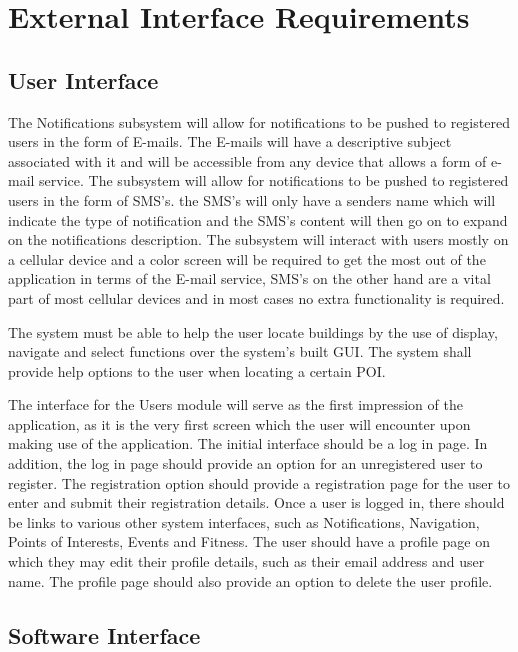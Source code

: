 \documentclass{article}
\begin{document}
\section{External Interface Requirements}
\subsection{User Interface}


The Notifications subsystem will allow for notifications to be pushed to registered users in the form of E-mails. The E-mails will have a descriptive subject associated with it and will be accessible from any device that allows a form of e-mail service.
The subsystem will allow for notifications to be pushed to registered users in the form of SMS's. the SMS's will only have a senders name which will indicate the type of notification and the SMS's content will then go on to expand on the notifications description.
The subsystem will interact with users mostly on a cellular device and a color screen will be required to get the most out of the application in terms of the E-mail service, SMS's on the other hand are a vital part of most cellular devices and in most cases no extra functionality is required.

The system must be able to help the user locate buildings by the use of display, navigate and select functions over the system's built GUI.
The system shall provide help options to the user when locating a certain POI.

\bigskip
The interface for the Users module will serve as the first impression of the application, as it is the very first screen which the user will encounter upon making use of the application. The initial interface should be a log in page. In addition, the log in page should provide an option for an unregistered user to register. The registration option should provide a registration page for the user to enter and submit their registration details. Once a user is logged in, there should be links to various other system interfaces, such as Notifications, Navigation, Points of Interests, Events and Fitness. The user should have a profile page on which they may edit their profile details, such as their email address and user name. The profile page should also provide an option to delete the user profile.

\subsection{Software Interface}
\end{document}
